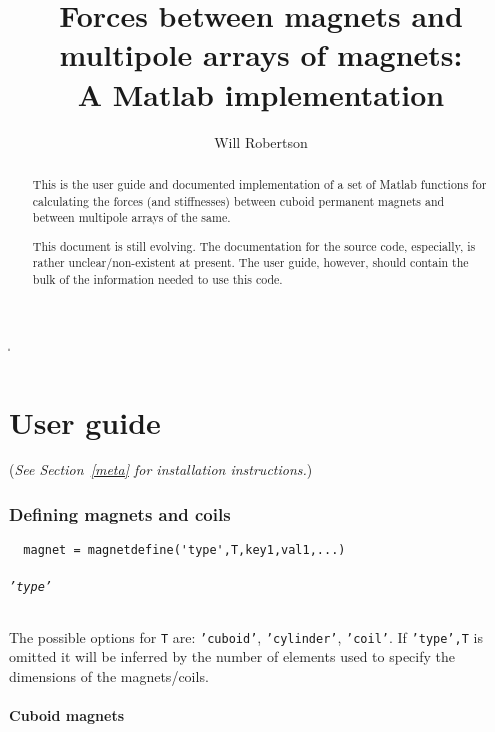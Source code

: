 \documentclass{article}
\begin{document}
\MakeShortVerb\|
\title{Forces between magnets and multipole arrays of magnets:\\ A Matlab implementation}
\author{Will Robertson}
\maketitle
\vfil
\begin{abstract}
This is the user guide and documented implementation of a set of
Matlab functions for calculating the forces (and stiffnesses) between
cuboid permanent magnets and between multipole arrays of the same.

This document is still evolving. The documentation for the source code,
especially, is rather unclear/non-existent at present. The user guide,
however, should contain the bulk of the information needed to use this code.
\end{abstract}

\newpage
\tableofcontents

\newpage

\part{User guide}

(\emph{See Section~\ref{meta} for installation instructions.})

\section{Defining magnets and coils}

\begin{Verbatim}
  magnet = magnetdefine('type',T,key1,val1,...)
\end{Verbatim}

\paragraph{\texttt{'type'}}
The possible options for \texttt{T} are: \texttt{'cuboid'}, \texttt{'cylinder'}, \texttt{'coil'}.
If \texttt{'type',T} is omitted it will be inferred by the number of elements used to specify the dimensions of the magnets/coils.

\subsection{Cuboid magnets}
\end{document}
